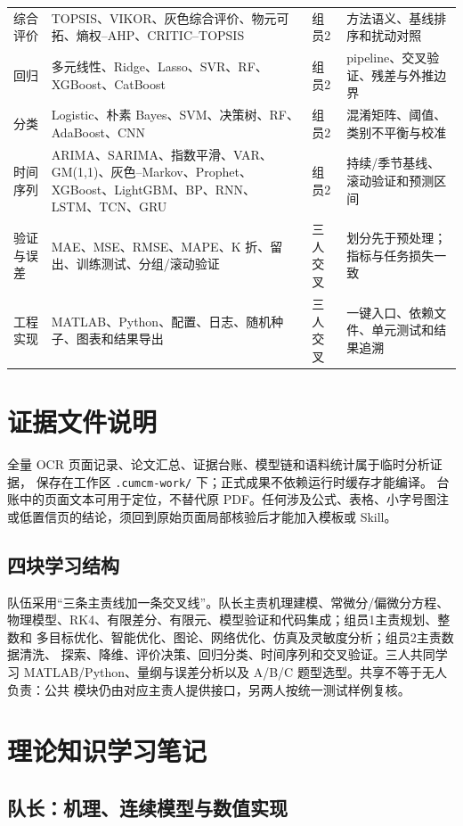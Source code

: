 \documentclass[UTF8,a4paper,12pt]{ctexart}
\begin{document}
{\begin{longtable}{p{2.1cm}p{5.0cm}p{2.0cm}p{5.5cm}}
综合评价 & TOPSIS、VIKOR、灰色综合评价、物元可拓、熵权--AHP、CRITIC--TOPSIS & 组员2 & 方法语义、基线排序和扰动对照\\
回归 & 多元线性、Ridge、Lasso、SVR、RF、XGBoost、CatBoost & 组员2 & pipeline、交叉验证、残差与外推边界\\
分类 & Logistic、朴素 Bayes、SVM、决策树、RF、AdaBoost、CNN & 组员2 & 混淆矩阵、阈值、类别不平衡与校准\\
时间序列 & ARIMA、SARIMA、指数平滑、VAR、GM(1,1)、灰色--Markov、Prophet、XGBoost、LightGBM、BP、RNN、LSTM、TCN、GRU & 组员2 & 持续/季节基线、滚动验证和预测区间\\
验证与误差 & MAE、MSE、RMSE、MAPE、K 折、留出、训练测试、分组/滚动验证 & 三人交叉 & 划分先于预处理；指标与任务损失一致\\
工程实现 & MATLAB、Python、配置、日志、随机种子、图表和结果导出 & 三人交叉 & 一键入口、依赖文件、单元测试和结果追溯\\
\bottomrule
\end{longtable}

\section{证据文件说明}

全量 OCR 页面记录、论文汇总、证据台账、模型链和语料统计属于临时分析证据，
保存在工作区 \texttt{.cumcm-work/} 下；正式成果不依赖运行时缓存才能编译。
台账中的页面文本可用于定位，不替代原 PDF。任何涉及公式、表格、小字号图注
或低置信页的结论，须回到原始页面局部核验后才能加入模板或 Skill。

}

\subsection{四块学习结构}

队伍采用“三条主责线加一条交叉线”。队长主责机理建模、常微分/偏微分方程、
物理模型、RK4、有限差分、有限元、模型验证和代码集成；组员1主责规划、整数和
多目标优化、智能优化、图论、网络优化、仿真及灵敏度分析；组员2主责数据清洗、
探索、降维、评价决策、回归分类、时间序列和交叉验证。三人共同学习
MATLAB/Python、量纲与误差分析以及 A/B/C 题型选型。共享不等于无人负责：公共
模块仍由对应主责人提供接口，另两人按统一测试样例复核。

\section{理论知识学习笔记}

\subsection{队长：机理、连续模型与数值实现}
\end{document}
